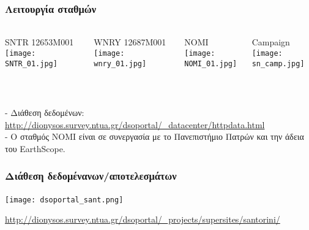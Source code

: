 \begin{frame}
  \frametitle{Λειτουργία σταθμών}
  \framesubtitle{}
  \label{}
  \vskip-1cm
  \begin{columns}[T]
    \begin{column}{.25\textwidth}
      \begin{center}
      {\scriptsize SNTR 12653M001}
        \texttt{[image: SNTR\_01.jpg]}
      \end{center}  
    \end{column}
    \begin{column}{.25\textwidth}
      \begin{center}
       {\scriptsize WNRY 12687M001}
        \texttt{[image: wnry\_01.jpg]}
      \end{center}       
    \end{column}
  \begin{column}{.25\textwidth}
      \begin{center}
       {\scriptsize NOMI}
        \texttt{[image: NOMI\_01.jpg]}
      \end{center}  
    \end{column}
    \begin{column}{.25\textwidth}
      \begin{center}
       {\scriptsize Campaign}
        \texttt{[image: sn\_camp.jpg]}
      \end{center}       
    \end{column}
  \end{columns}  
  ~\\[1em]
\begin{scriptsize}
- Διάθεση δεδομένων: \url{http://dionysos.survey.ntua.gr/dsoportal/\_datacenter/httpdata.html}\\
- Ο σταθμός ΝΟΜΙ είναι σε συνεργασία με το Πανεπιστήμιο Πατρών και την άδεια του EarthScope.
\end{scriptsize}

\end{frame}
\note{}

\begin{frame}
  \frametitle{Διάθεση δεδομένανων/αποτελεσμάτων}
  \framesubtitle{}
  \label{}
  \vskip-1.2cm
\begin{center}
  \texttt{[image: dsoportal\_sant.png]}
\end{center}
\url{http://dionysos.survey.ntua.gr/dsoportal/\_projects/supersites/santorini/}
\end{frame}
\note{}